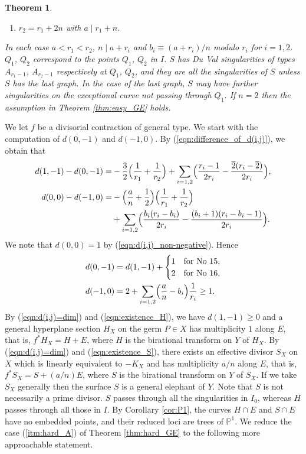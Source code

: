 \documentclass[a4paper,11pt]{amsart}
\newtheorem{theorem}{Theorem}[section]
\theoremstyle{definition}
\theoremstyle{remark}
\numberwithin{equation}{section}
\newcommand{\bP}{{\mathbb P}}
\begin{document}
\begin{theorem}
\begin{enumerate}
\begin{enumerate}
\item
$r_2=r_1+2n$ with $a \mid r_1+n$.
\end{enumerate}
In each case $a<r_1<r_2$,
$n \mid a+r_i$
and $b_i \equiv (a+r_i)/n$ modulo $r_i$ for $i=1,2$.
$Q_1$, $Q_2$ correspond to the points $Q_1$, $Q_2$ in $I$.
$S$ has Du Val singularities of types $A_{r_1-1}$, $A_{r_2-1}$
respectively at $Q_1$, $Q_2$,
and they are all the singularities of $S$
unless $S$ has the last graph.
In the case of the last graph,
$S$ may have further singularities
on the exceptional curve not passing through $Q_1$.
If $n=2$ then the assumption in Theorem \textup{\ref{thm:easy_GE}} holds.
\end{enumerate}
\end{theorem}

We let $f$ be a divisorial contraction of general type.
We start with the computation of $d(0,-1)$ and $d(-1,0)$.
By (\ref{eqn:difference_of_d(i,j)}),
we obtain that
\begin{align*}
d(1,-1)-d(0,-1) = & -\frac{3}{2}\Bigl(\frac{1}{r_1}+\frac{1}{r_2}\Bigr)
+\sum_{i=1,2}\Bigl(\frac{r_i-1}{2r_i}
-\frac{\overline{2}(r_i-\overline{2})}{2r_i}\Bigr), \\
d(0,0)-d(-1,0) = & -\Bigl(\frac{a}{n}+\frac{1}{2}\Bigr)
\Bigl(\frac{1}{r_1}+\frac{1}{r_2}\Bigr) \\
& + \sum_{i=1,2}\Bigl(\frac{b_i(r_i-b_i)}{2r_i}
-\frac{(b_i+1)(r_i-b_i-1)}{2r_i}\Bigr).
\end{align*}
We note that $d(0,0)=1$ by (\ref{eqn:d(i,j)_non-negative}).
Hence
\begin{align}
d(0,-1)&=d(1,-1)+
\begin{cases}
1 & \textrm{for No 15},\\
2 & \textrm{for No 16},
\end{cases}
\label{eqn:existence_H} \\
d(-1,0)&=2+\sum_{i=1,2}\Bigl(\frac{a}{n}-b_i\Bigr)\frac{1}{r_i}
\ge1.\label{eqn:existence_S}
\end{align}
By (\ref{eqn:d(i,j)=dim}) and (\ref{eqn:existence_H}),
we have $d(1,-1) \ge 0$ and
a general hyperplane section $H_X$ on the germ $P \in X$ has
multiplicity $1$ along $E$, that is,
$f^*H_X=H+E$, where $H$ is the birational transform on $Y$ of $H_X$.
By (\ref{eqn:d(i,j)=dim}) and (\ref{eqn:existence_S}),
there exists an effective divisor $S_X$ on $X$
which is linearly equivalent to $-K_X$ and has
multiplicity $a/n$ along $E$, that is,
$f^*S_X=S+(a/n)E$, where $S$ is the birational transform on $Y$ of $S_X$.
If we take $S_X$ generally
then the surface $S$ is a general elephant of $Y$.
Note that $S$ is not necessarily a prime divisor.
$S$ passes through all the singularities in $I_0$,
whereas $H$ passes through all those in $I$.
By Corollary \ref{cor:P1},
the curves $H \cap E$ and $S \cap E$ have no embedded points,
and their reduced loci are trees of $\bP^1$.
We reduce the case (\ref{itm:hard_A}) of Theorem \ref{thm:hard_GE}
to the following more approachable statement.
\end{document}
